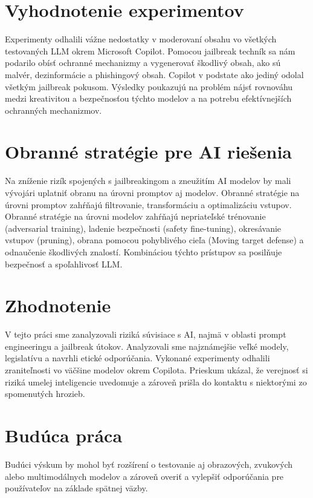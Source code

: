\section*{Vyhodnotenie experimentov \label{sec:experiments_eval_resume}}

Experimenty odhalili vážne nedostatky v moderovaní obsahu vo všetkých testovaných LLM okrem Microsoft Copilot. Pomocou jailbreak techník sa nám podarilo obísť ochranné mechanizmy a vygenerovať škodlivý obsah, ako sú malvér, dezinformácie a phishingový obsah. Copilot v podstate ako jediný odolal všetkým jailbreak pokusom. Výsledky poukazujú na problém nájsť rovnováhu medzi kreativitou a bezpečnosťou týchto modelov a na potrebu efektívnejších ochranných mechanizmov.

\section*{Obranné stratégie pre AI riešenia \label{sec:mitigation_strategies_resume}}

Na zníženie rizík spojených s jailbreakingom a zneužitím AI modelov by mali vývojári uplatniť obranu na úrovni promptov aj modelov. Obranné stratégie na úrovni promptov zahŕňajú filtrovanie, transformáciu a optimalizáciu vstupov. Obranné stratégie na úrovni modelov zahŕňajú nepriateľské trénovanie (adversarial training), ladenie bezpečnosti (safety fine-tuning), okresávanie vstupov (pruning), obrana pomocou pohyblivého cieľa (Moving target defense) a odnaučenie škodlivých znalostí. Kombináciou týchto prístupov sa posilňuje bezpečnosť a spoľahlivosť LLM.

\section*{Zhodnotenie \label{sec:conclusion_summary_resume}}

V tejto práci sme zanalyzovali riziká súvisiace s AI, najmä v oblasti prompt engineeringu a jailbreak útokov. Analyzovali sme najznámejšie veľké modely, legislatívu a navrhli etické odporúčania. Vykonané experimenty odhalili zraniteľnosti vo väčšine modelov okrem Copilota. Prieskum ukázal, že verejnosť si riziká umelej inteligencie uvedomuje a zároveň prišla do kontaktu s niektorými zo spomenutých hrozieb.

\section*{Budúca práca \label{sec:future_work_resume}}

Budúci výskum by mohol byť rozšírení o testovanie aj obrazových, zvukových alebo multimodálnych modelov a zároveň overiť a vylepšiť odporúčania pre používateľov na základe spätnej väzby.